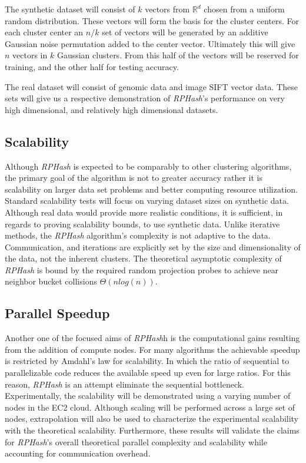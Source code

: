 \documentclass[a4paper,10pt]{article}
\begin{document}
The synthetic dataset will consist of $k$ vectors from $\mathbb{R}^d$ chosen
from a uniform random distribution.  These vectors will form the basis for
the cluster centers.  For each cluster center an $n/k$ set of vectors will
be generated by an additive Gaussian noise permutation added to the center
vector.  Ultimately this will give $n$ vectors in $k$ Gaussian clusters.
From this half of the vectors will be reserved for training, and the other
half for testing accuracy.

The real dataset will consist of genomic data and image SIFT vector data.
These sets will give us a respective demonstration of \emph{RPHash}'s
performance on very high dimensional, and relatively high dimensional datasets.

\subsection{Scalability} Although \emph{RPHash} is expected to be comparably
to other clustering algorithms, the primary goal of the algorithm is not to
greater accuracy rather it is scalability on larger data set problems and
better computing resource utilization.	Standard scalability tests will focus
on varying dataset sizes on synthetic data.  Although real data would provide
more realistic conditions, it is sufficient, in regards to proving scalability
bounds, to use synthetic data.	Unlike iterative methods, the \emph{RPHash}
algorithm's complexity is not adaptive to the data.  Communication, and
iterations are explicitly set by the size and dimensionality of the data, not
the inherent clusters.	The theoretical asymptotic complexity of \emph{RPHash}
is bound by the required random projection probes to achieve near neighbor
bucket collisions $\Theta({n log(n)})$.

\subsection{Parallel Speedup} Another one of the focused aims of \emph{RPHash}h
is the computational gains resulting from the addition of compute nodes.
For many algorithms the achievable speedup is restricted by Amdahl's law for
scalability.  In which the ratio of sequential to parallelizable code reduces
the available speed up even for large ratios.  For this reason, \emph{RPHash}
is an attempt eliminate the sequential bottleneck.  Experimentally, the
scalability will be demonstrated using a varying number of nodes in the
EC2 cloud.  Although scaling will be performed across a large set of nodes,
extrapolation will also be used to characterize the experimental scalability
with the theoretical scalability.  Furthermore, these results will validate
the claims for \emph{RPHash}'s overall theoretical parallel complexity and
scalability while accounting for communication overhead.
\end{document}
